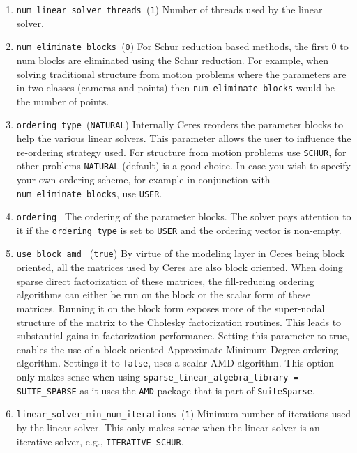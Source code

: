 \begin{enumerate}
\item{\texttt{num\_linear\_solver\_threads }}(\texttt{1}) Number of threads used by the linear solver.

\item{\texttt{num\_eliminate\_blocks }}(\texttt{0})
For Schur reduction based methods, the first 0 to num blocks are
    eliminated using the Schur reduction. For example, when solving
     traditional structure from motion problems where the parameters are in
     two classes (cameras and points) then \texttt{num\_eliminate\_blocks} would be the
     number of points.

\item{\texttt{ordering\_type }}(\texttt{NATURAL})
 Internally Ceres reorders the parameter blocks to help the
 various linear solvers. This parameter allows the user to
     influence the re-ordering strategy used. For structure from
     motion problems use \texttt{SCHUR}, for other problems \texttt{NATURAL} (default)
     is a good choice. In case you wish to specify your own ordering
     scheme, for example in conjunction with \texttt{num\_eliminate\_blocks},
     use \texttt{USER}.

\item{\texttt{ordering }} The ordering of the parameter blocks. The solver pays attention
    to it if the \texttt{ordering\_type} is set to \texttt{USER} and the ordering vector is
    non-empty.

\item{\texttt{use\_block\_amd } (\texttt{true})} By virtue of the modeling layer in Ceres being block oriented,
all the matrices used by Ceres are also block oriented.
When doing sparse direct factorization of these matrices, the
fill-reducing ordering algorithms can either be run on the
block or the scalar form of these matrices. Running it on the
block form exposes more of the super-nodal structure of the
matrix to the Cholesky factorization routines. This leads to
substantial gains in factorization performance. Setting this parameter to true, enables the use of a block oriented Approximate Minimum Degree ordering algorithm. Settings it to \texttt{false}, uses a scalar AMD algorithm. This option only makes sense when using \texttt{sparse\_linear\_algebra\_library = SUITE\_SPARSE} as it uses the \texttt{AMD} package that is part of \texttt{SuiteSparse}.

\item{\texttt{linear\_solver\_min\_num\_iterations }}(\texttt{1}) Minimum number of iterations used by the linear solver. This only makes sense when the linear solver is an iterative solver, e.g., \texttt{ITERATIVE\_SCHUR}.


\end{enumerate}
